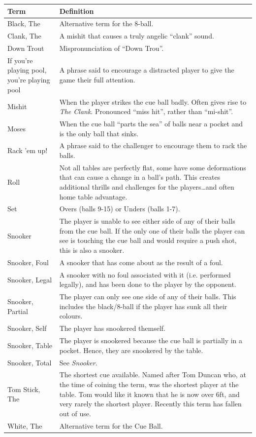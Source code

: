 \documentclass[a4paper, twocolumn]{article}
\begin{document}
\small
\begin{center}
    \begin{tabular}{  p{}  p{}  } 
      \hline
      \textbf{Term} & \textbf{Definition} \\ \hline
      Black, The & Alternative term for the 8-ball. \\ \hline
      Clank, The & A mishit that causes a truly angelic “clank” sound. \\ \hline
      Down Trout & Mispronunciation of “Down Trou”. \\ \hline
      If you're playing pool, you're playing pool & A phrase said to encourage a distracted player to give the game their full attention. \\ \hline
      Mishit & When the player strikes the cue ball badly. Often gives rise to \emph{The Clank}. Pronounced “miss hit”, rather than “mi-shit”.\\ \hline
      Moses & When the cue ball “parts the sea” of balls near a pocket and is the only ball that sinks. \\ \hline
      Rack 'em up! & A phrase said to the challenger to encourage them to rack the balls. \\ \hline
      Roll & Not all tables are perfectly flat, some have some deformations that can cause a change in a ball's path. This creates additional thrills and challenges for the players\dots and often home table advantage.\\ \hline
      Set & Overs (balls 9-15) or Unders (balls 1-7). \\ \hline
      Snooker & The player is unable to see either side of any of their balls from the cue ball. If the only one of their balls the player can see is touching the cue ball and would require a push shot, this is also a snooker.\\ \hline
      Snooker, Foul & A snooker that has come about as the result of a foul. \\ \hline
      Snooker, Legal & A snooker with no foul associated with it (i.e. performed legally), and has been done to the player by the opponent. \\ \hline
      Snooker, Partial & The player can only see one side of any of their balls. This includes the black/8-ball if the player has sunk all their colours. \\ \hline
      Snooker, Self & The player has snookered themself. \\ \hline
      Snooker, Table & The player is snookered because the cue ball is partially in a pocket. Hence, they are snookered by the table.\\ \hline
      Snooker, Total & See \emph{Snooker}. \\ \hline
      Tom Stick, The & The shortest cue available. Named after Tom Duncan who, at the time of coining the term, was the shortest player at the table. Tom would like it known that he is now over 6ft, and very rarely the shortest player. Recently this term has fallen out of use. \\ \hline
      White, The & Alternative term for the Cue Ball. \\ \hline
    \end{tabular}
\end{center}
\normalsize

\newpage
\end{document}
